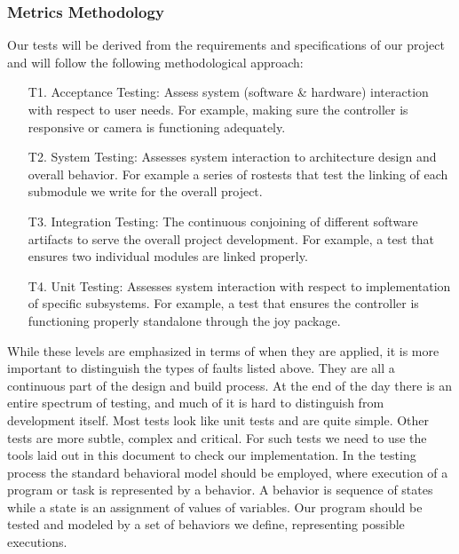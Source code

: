 \documentclass[english,12pt]{article}
\begin{document}
\subsubsection{Metrics Methodology}
Our tests will be derived from the requirements and specifications of our project and will follow 
the following methodological approach:
\begin{itemize}
    \item[T1.] Acceptance Testing: Assess system (software \& hardware) interaction with respect 
    to user needs. For example, making sure the controller is responsive or camera is functioning 
    adequately.
    \item[T2.] System Testing: Assesses system interaction to architecture design and overall behavior. 
    For example a series of rostests that test the linking of each submodule we write for the overall 
    project.
    \item[T3.] Integration Testing: The continuous conjoining of different software artifacts to 
    serve the overall project development. For example, a test that ensures two individual modules are 
    linked properly.
    \item[T4.] Unit Testing: Assesses system interaction with respect to implementation of specific subsystems. 
    For example, a test that ensures the controller is functioning properly standalone through the joy 
    package.
\end{itemize}
While these levels are emphasized in terms of when they are applied, it is more important to distinguish 
the types of faults listed above. They are all a continuous part of the design and build process. At 
the end of the day there is an entire spectrum of testing, and much of it is hard to distinguish from 
development itself. Most tests look like unit tests and are quite simple. Other tests are more subtle, 
complex and critical. For such tests we need to use the tools laid out in this document to check our 
implementation. In the testing process the standard behavioral model should be employed, where 
execution of a program or task is represented by a behavior. A behavior is sequence of states while a state 
is an assignment of values of variables. Our program should be tested and modeled by a set of behaviors 
we define, representing possible executions. 
\end{document}
